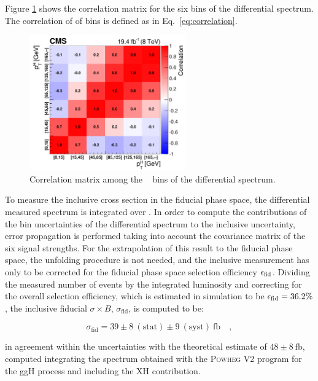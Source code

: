 Figure \ref{fig:cov_matrix} shows  the correlation matrix for the six bins of the differential spectrum. The correlation of of bins is defined as in Eq.~\eqref{eq:correlation}.

\begin{figure}[!h]
\centering
\includegraphics[width=0.6\textwidth]{images/unblinding/covMatrix.pdf}
\caption{Correlation matrix among the \pth~ bins of the differential spectrum.}\label{fig:cov_matrix}
\end{figure}

To measure the inclusive cross section in the fiducial phase space, the differential measured spectrum is integrated over \pth. In order to compute the contributions of the bin uncertainties of the differential spectrum to the inclusive uncertainty,  error propagation is performed taking into account the covariance matrix of the six signal strengths. For the extrapolation of this result to the fiducial phase space, the unfolding procedure is not needed, and the inclusive measurement has only to be corrected for the fiducial phase space selection efficiency $\epsilon_{\rm{fid}}$. Dividing the measured number of events by the integrated luminosity and correcting for the overall selection efficiency, which is estimated in simulation to be $\epsilon_{\rm{fid}} = 36.2 \%$, the inclusive fiducial $\sigma \times B$, $\sigma_{\mathrm{fid}}$, is computed to be:

\begin{equation}
\sigma_{\mathrm{fid}} = 39\pm 8~(\mathrm{stat}) \pm 9~(\mathrm{syst})~\mathrm{fb} \quad ,
\end{equation} 

in agreement within the uncertainties with the theoretical estimate of $48 \pm 8 ~\mathrm{fb}$, computed integrating the spectrum obtained with the \textsc{Powheg V2} program for the ggH process and including the XH contribution.
